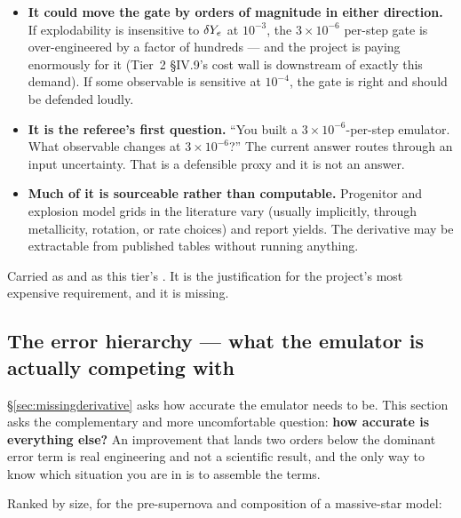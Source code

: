 \begin{itemize}
\item \textbf{It could move the gate by orders of magnitude in either
  direction.} If explodability is insensitive to $\delta Y_{e}$ at $10^{-3}$, the
  $3 \times 10^{-6}$ per-step gate is over-engineered by a factor of hundreds
  --- and the project is paying enormously for it (Tier~2 \S IV.9's cost wall
  is downstream of exactly this demand). If some observable is sensitive at
  $10^{-4}$, the gate is right and should be defended loudly.
\item \textbf{It is the referee's first question.} ``You built a $3 \times
  10^{-6}$-per-step emulator. What observable changes at $3 \times 10^{-6}$?''
  The current answer routes through an input uncertainty. That is a defensible
  proxy and it is not an answer.
\item \textbf{Much of it is sourceable rather than computable.} Progenitor and
  explosion model grids in the literature vary \Ye{} (usually implicitly,
  through metallicity, rotation, or rate choices) and report yields. The
  derivative may be extractable from published tables without running anything.
\end{itemize}

Carried as  and as this tier's . It is the
justification for the project's most expensive requirement, and it is missing.

\subsection{The error hierarchy --- what the emulator is actually competing with}
\label{sec:errorhierarchy}

\S\ref{sec:missingderivative} asks how accurate the emulator needs to be. This
section asks the complementary and more uncomfortable question: \textbf{how
accurate is everything else?} An improvement that lands two orders below the
dominant error term is real engineering and not a scientific result, and the
only way to know which situation you are in is to assemble the terms.

Ranked by size, for the pre-supernova \Ye{} and composition of a massive-star
model:

